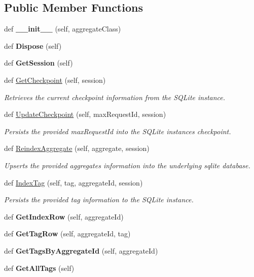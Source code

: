 \subsection*{Public Member Functions}
\begin{DoxyCompactItemize}
\item 
def {\bfseries \+\_\+\+\_\+init\+\_\+\+\_\+} (self, aggregate\+Class)
\item 
def {\bfseries Dispose} (self)
\item 
def {\bfseries Get\+Session} (self)
\item 
def \hyperlink{group__Chronos_gac76ddb048aa12434e964963fe6b08abc}{Get\+Checkpoint} (self, session)
\begin{DoxyCompactList}\small\item\em Retrieves the current checkpoint information from the S\+Q\+Lite instance. \end{DoxyCompactList}\item 
def \hyperlink{group__Chronos_ga999de3bf409634d23dbdce8483f38beb}{Update\+Checkpoint} (self, max\+Request\+Id, session)
\begin{DoxyCompactList}\small\item\em Persists the provided max\+Request\+Id into the S\+Q\+Lite instance\textquotesingle{}s checkpoint. \end{DoxyCompactList}\item 
def \hyperlink{group__Chronos_gadee7d443d8b7f4f600db3e666388bfd2}{Reindex\+Aggregate} (self, aggregate, session)
\begin{DoxyCompactList}\small\item\em Upserts the provided aggregate\textquotesingle{}s information into the underlying sqlite database. \end{DoxyCompactList}\item 
def \hyperlink{group__Chronos_ga3f3b13bc9ea88c0ff50c1da74c76baa3}{Index\+Tag} (self, tag, aggregate\+Id, session)
\begin{DoxyCompactList}\small\item\em Persists the provided tag information to the S\+Q\+Lite instance. \end{DoxyCompactList}\item 
def {\bfseries Get\+Index\+Row} (self, aggregate\+Id)
\item 
def {\bfseries Get\+Tag\+Row} (self, aggregate\+Id, tag)
\item 
def {\bfseries Get\+Tags\+By\+Aggregate\+Id} (self, aggregate\+Id)
\item 
def {\bfseries Get\+All\+Tags} (self)

\end{DoxyCompactItemize}
